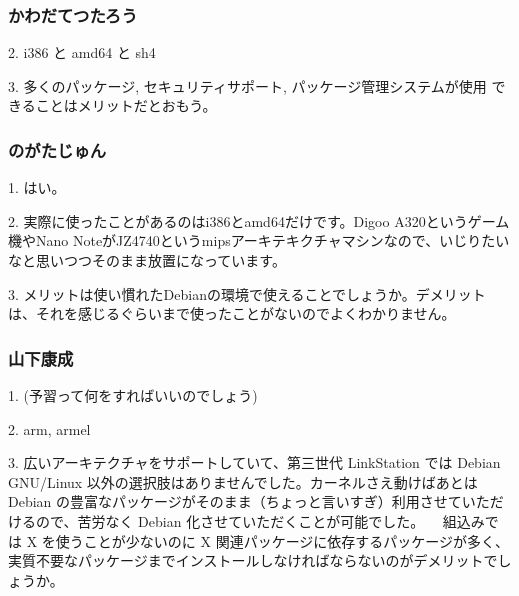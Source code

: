 \documentclass[cjk,dvipdfmx,12pt,%
hyperref={bookmarks=true,bookmarksnumbered=true,bookmarksopen=false,%
colorlinks=false,%
pdftitle={第38回関西Debian勉強会},%
pdfauthor={倉敷・のがた・佐々木},%
pdfsubject={資料},%
}]{beamer}
\begin{document}
\begin{frame}[fragile]
\frametitle{ かわだてつたろう }



\begin{verbatimtab}
2. i386 と amd64 と sh4

3. 多くのパッケージ, セキュリティサポート, パッケージ管理システムが使用
 できることはメリットだとおもう。
\end{verbatimtab}


\end{frame}



\begin{frame}[fragile]
\frametitle{ のがたじゅん }



\begin{verbatimtab}
1. はい。

2. 実際に使ったことがあるのはi386とamd64だけです。Digoo A320というゲーム機やNano NoteがJZ4740というmipsアーキテキクチャマシンなので、いじりたいなと思いつつそのまま放置になっています。

3. メリットは使い慣れたDebianの環境で使えることでしょうか。デメリットは、それを感じるぐらいまで使ったことがないのでよくわかりません。
\end{verbatimtab}


\end{frame}



\begin{frame}[fragile]
\frametitle{ 山下康成 }


{\small
\begin{verbatimtab}
1. (予習って何をすればいいのでしょう)

2. arm, armel

3. 広いアーキテクチャをサポートしていて、第三世代
LinkStation では Debian GNU/Linux 以外の選択肢はありませんでした。カーネルさえ動けばあとは Debian の豊富なパッケージがそのまま（ちょっと言いすぎ）利用させていただけるので、苦労なく Debian 化させていただくことが可能でした。
　組込みでは X を使うことが少ないのに X 関連パッケージに依存するパッケージが多く、実質不要なパッケージまでインストールしなければならないのがデメリットでしょうか。
\end{verbatimtab}
}

\end{frame}
\end{document}
